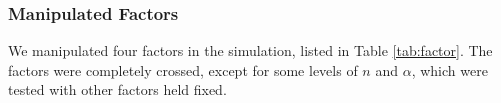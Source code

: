 \documentclass[]{article}
\begin{document}
\subsubsection{Manipulated Factors}\label{sec:manipulatedFactors}
We manipulated four factors in the simulation, listed in Table \ref{tab:factor}.
The factors were completely crossed, except for some levels of $n$ and $\alpha$, which were tested with other factors held fixed. 

\end{document}
